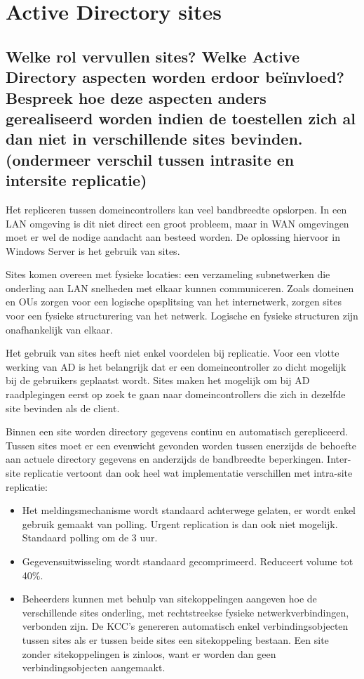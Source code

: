 \chapter{Active Directory sites}

\section{Welke rol vervullen sites? Welke Active Directory aspecten worden
erdoor beïnvloed? Bespreek hoe deze aspecten anders gerealiseerd worden indien
de toestellen zich al dan niet in verschillende sites bevinden. (ondermeer
verschil tussen intrasite en intersite replicatie)}

Het repliceren tussen domeincontrollers kan veel bandbreedte opslorpen. In een
LAN omgeving is dit niet direct een groot probleem, maar in WAN omgevingen moet
er wel de nodige aandacht aan besteed worden. De oplossing hiervoor in Windows
Server is het gebruik van sites.

Sites komen overeen met fysieke locaties: een verzameling subnetwerken die
onderling aan LAN snelheden met elkaar kunnen communiceren. Zoals domeinen en
OUs zorgen voor een logische opsplitsing van het internetwerk, zorgen sites voor
een fysieke structurering van het netwerk. Logische en fysieke structuren zijn
onafhankelijk van elkaar.

Het gebruik van sites heeft niet enkel voordelen bij replicatie. Voor een vlotte
werking van AD is het belangrijk dat er een domeincontroller zo dicht mogelijk
bij de gebruikers geplaatst wordt. Sites maken het mogelijk om bij AD
raadplegingen eerst op zoek te gaan naar domeincontrollers die zich in dezelfde
site bevinden als de client.

Binnen een site worden directory gegevens continu en automatisch gerepliceerd.
Tussen sites moet er een evenwicht gevonden worden tussen enerzijds de behoefte
aan actuele directory gegevens en anderzijds de bandbreedte beperkingen.
Inter-site replicatie vertoont dan ook heel wat implementatie verschillen met
intra-site replicatie:
\begin{itemize}
	\item Het meldingsmechanisme wordt standaard achterwege gelaten, er
		wordt enkel gebruik gemaakt van polling. Urgent replication is
		dan ook niet mogelijk. Standaard polling om de 3 uur.
	\item Gegevensuitwisseling wordt standaard gecomprimeerd. Reduceert
		volume tot 40\%.
	\item Beheerders kunnen met behulp van sitekoppelingen aangeven hoe de
		verschillende sites onderling, met rechtstreekse fysieke
		netwerkverbindingen, verbonden zijn. De KCC's genereren
		automatisch enkel verbindingsobjecten tussen sites als er tussen
		beide sites een sitekoppeling bestaan. Een site zonder
		sitekoppelingen is zinloos, want er worden dan geen
		verbindingsobjecten aangemaakt.
\end{itemize}


